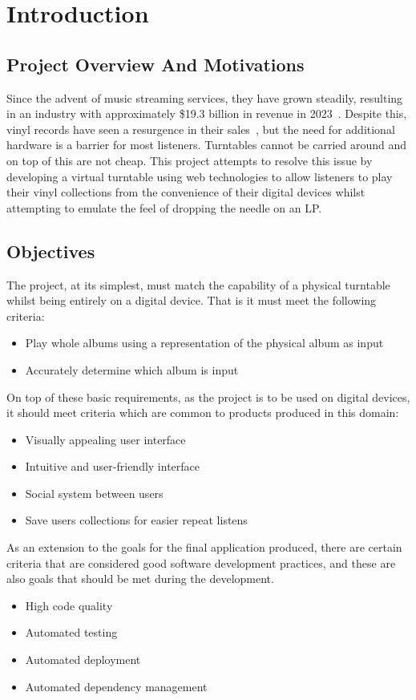 \chapter{Introduction}\label{cha:intro}

\section{Project Overview And Motivations}
Since the advent of music streaming services, they have grown steadily, resulting in an industry with approximately \$19.3 billion in revenue in 2023~\cite{IFPI}. Despite this, vinyl records have seen a resurgence in their sales~\cite{BPI}, but the need for additional hardware is a barrier for most listeners. Turntables cannot be carried around and on top of this are not cheap. This project attempts to resolve this issue by developing a virtual turntable using web technologies to allow listeners to play their vinyl collections from the convenience of their digital devices whilst attempting to emulate the feel of dropping the needle on an LP.\@

\section{Objectives}\label{sec:objectives}
The project, at its simplest, must match the capability of a physical turntable whilst being entirely on a digital device. That is it must meet the following criteria:
\begin{itemize}
    \item Play whole albums using a representation of the physical album as input
    \item Accurately determine which album is input
\end{itemize}
On top of these basic requirements, as the project is to be used on digital devices, it should meet criteria which are common to products produced in this domain:
\begin{itemize}
    \item Visually appealing user interface
    \item Intuitive and user-friendly interface
    \item Social system between users
    \item Save users collections for easier repeat listens
\end{itemize}
As an extension to the goals for the final application produced, there are certain criteria that are considered good software development practices, and these are also goals that should be met during the development.
\begin{itemize}
    \item High code quality
    \item Automated testing
    \item Automated deployment
    \item Automated dependency management
\end{itemize}

